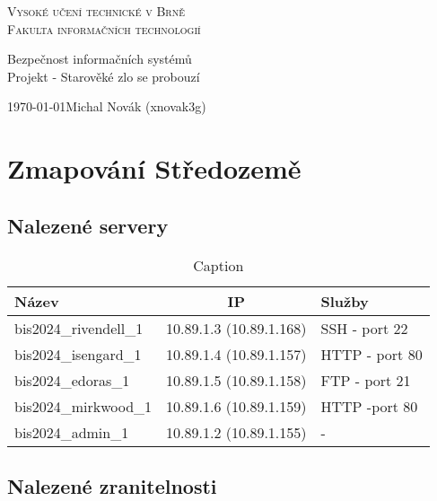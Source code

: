 \documentclass[a4paper, 11pt]{article}
\begin{document}
    \begin{titlepage}
        \begin{center}
            \Huge{\scshape{Vysoké učení technické v Brně}\\}
            \huge{\scshape Fakulta informačních technologií\\}

            \LARGE{Bezpečnost informačních systémů\\}
            \Huge{Projekt \-- Starověké zlo se probouzí}

        \end{center}
        
        \Large{\today \hfill Michal Novák (xnovak3g)}
    \end{titlepage}


\section{Zmapování Středozemě}
\subsection{Nalezené servery}

\begin{table}[!ht]
    \centering
    \begin{tabular}{|l|c|l|}
         \hline
         Název & IP & Služby \\ 
         \hline\hline
         bis2024\_rivendell\_1 & 10.89.1.3 (10.89.1.168)& SSH - port 22\\ 
         \hline
         bis2024\_isengard\_1 & 10.89.1.4 (10.89.1.157)& HTTP - port 80\\
         \hline
         bis2024\_edoras\_1 & 10.89.1.5 (10.89.1.158)& FTP - port 21\\
         \hline
         bis2024\_mirkwood\_1 & 10.89.1.6 (10.89.1.159)& HTTP -port 80\\
         \hline
         bis2024\_admin\_1 & 10.89.1.2 (10.89.1.155)& - \\
         \hline
         
    \end{tabular}
    \caption{Caption}
    \label{tab:my_label}
\end{table}

\subsection{Nalezené zranitelnosti}
\end{document}
